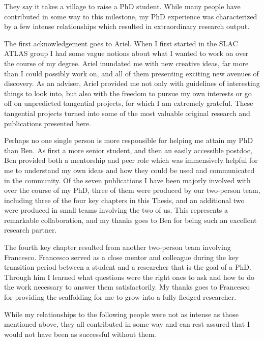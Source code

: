 They say it takes a village to raise a PhD student.
While many people have contributed in some way to this milestone, my PhD experience was characterized by a few intense relationships which resulted in extraordinary research output.

The first acknowledgement goes to Ariel.
When I first started in the SLAC ATLAS group I had some vague notions about what I wanted to work on over the course of my degree.
Ariel inundated me with new creative ideas, far more than I could possibly work on, and all of them presenting exciting new avenues of discovery.
As an adviser, Ariel provided me not only with guidelines of interesting things to look into, but also with the freedom to pursue my own interests or go off on unpredicted tangential projects, for which I am extremely grateful.
These tangential projects turned into some of the most valuable original research and publications presented here.

Perhaps no one single person is more responsible for helping me attain my PhD than Ben.
As first a more senior student, and then an easily accessible postdoc, Ben provided both a mentorship and peer role which was immensively helpful for me to understand my own ideas and how they could be used and communicated in the community.
Of the seven publications I have been majorly involved with over the course of my PhD, three of them were produced by our two-person team, including three of the four key chapters in this Thesis, and an additional two were produced in small teams involving the two of us.
This represents a remarkable collaboration, and my thanks goes to Ben for being such an excellent research partner. 

The fourth key chapter resulted from another two-person team involving Francesco.
Francesco served as a close mentor and colleague during the key transition period between a student and a researcher that is the goal of a PhD.
Through him I learned what questions were the right ones to ask and how to do the work necessary to answer them satisfactorily.
My thanks goes to Francesco for providing the scaffolding for me to grow into a fully-fledged researcher.

While my relationships to the following people were not as intense as those mentioned above, they all contributed in some way and can rest assured that I would not have been as successful without them.

